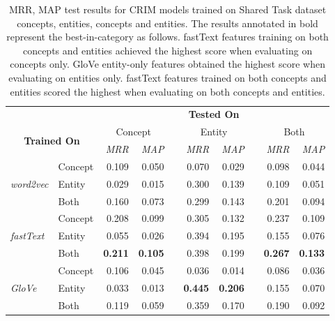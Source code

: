 \begin{table}\centering
\begin{tabular}{@{}llrrcrrcrr@{}}\toprule
& & \multicolumn{8}{c}{\textbf{Tested On}}\\ 
\cmidrule{3-10}
\multicolumn{2}{c}{\multirow[c]{2}{*}{\textbf{Trained On}}} & \multicolumn{2}{c}{Concept} & \phantom{a} & \multicolumn{2}{c}{Entity} & \phantom{a} & \multicolumn{2}{c}{Both}\\ 
\multicolumn{2}{c}{} & \textit{MRR} & \textit{MAP} && \textit{MRR} & \textit{MAP} && \textit{MRR} & \textit{MAP}\\
\cmidrule{3-4} \cmidrule{6-7} \cmidrule{9-10}  
\multirow{3}{*}{\textit{word2vec}} 
& Concept & 0.109 & 0.050 && 0.070 & 0.029 && 0.098 & 0.044\\
& Entity & 0.029 & 0.015 && 0.300 & 0.139 && 0.109 & 0.051\\
& Both & 0.160 & 0.073 && 0.299 & 0.143 && 0.201 & 0.094 \\ \midrule

\multirow{3}{*}{\textit{fastText}} 
& Concept & 0.208 & 0.099 && 0.305 & 0.132 && 0.237 & 0.109\\
& Entity & 0.055 & 0.026 && 0.394 & 0.195 && 0.155 & 0.076\\
& Both & \textbf{0.211} & \textbf{0.105} && 0.398 & 0.199 && \textbf{0.267} & \textbf{0.133}\\ \midrule

\multirow{3}{*}{\textit{GloVe}} 
& Concept & 0.106 & 0.045 && 0.036 & 0.014 && 0.086 & 0.036 \\
& Entity & 0.033 & 0.013 && \textbf{0.445} & \textbf{0.206} && 0.155 & 0.070 \\
& Both & 0.119 & 0.059 && 0.359 & 0.170 && 0.190 & 0.092\\ 
\bottomrule
\end{tabular}
\caption[MRR, MAP test results for CRIM models trained on concepts, entities, concepts and entities]{MRR, MAP test results for CRIM models trained on Shared Task dataset concepts, entities, concepts and entities.  The results annotated in bold represent the best-in-category as follows. fastText features training on both concepts and entities achieved the highest score when evaluating on concepts only.  GloVe entity-only features obtained the highest score when evaluating on entities only.  fastText features trained on both concepts and entities scored the highest when evaluating on both concepts and entities.}
\label{tab:semeval_wordtype_results}
\end{table}


